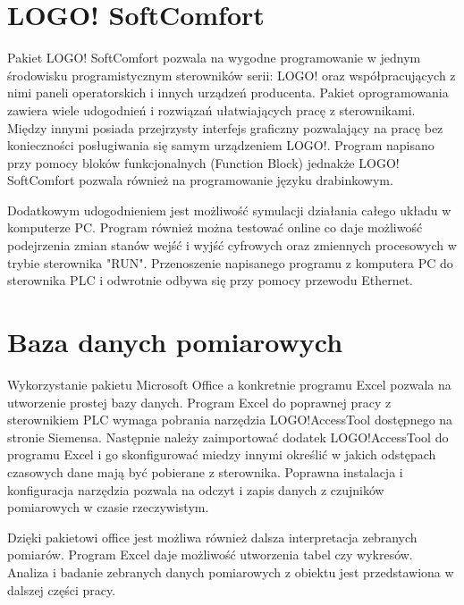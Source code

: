 \documentclass[oneside]{mgr}
\begin{document}
\section{LOGO! SoftComfort}
Pakiet LOGO! SoftComfort pozwala na wygodne programowanie w jednym środowisku programistycznym sterowników serii: LOGO! oraz współpracujących z nimi paneli operatorskich i innych urządzeń producenta. Pakiet oprogramowania zawiera wiele udogodnień i rozwiązań ułatwiających pracę z sterownikami. Między innymi posiada przejrzysty interfejs graficzny pozwalający na pracę bez konieczności posługiwania się samym urządzeniem LOGO!. Program napisano przy pomocy bloków funkcjonalnych (Function Block) jednakże LOGO! SoftComfort pozwala również na programowanie języku drabinkowym.

Dodatkowym udogodnieniem jest możliwość symulacji działania całego układu w komputerze PC. Program również można testować online co daje możliwość podejrzenia zmian stanów wejść i wyjść cyfrowych oraz zmiennych procesowych w trybie sterownika "RUN". Przenoszenie napisanego programu z komputera PC do sterownika PLC i odwrotnie odbywa się przy pomocy przewodu Ethernet.

\section{Baza danych pomiarowych}
Wykorzystanie pakietu Microsoft Office a konkretnie programu Excel pozwala na utworzenie prostej bazy danych. Program Excel do poprawnej pracy z sterownikiem PLC wymaga pobrania narzędzia LOGO!AccessTool dostępnego na stronie Siemensa. Następnie należy zaimportować dodatek LOGO!AccessTool do programu Excel i go skonfigurować miedzy innymi określić w jakich odstępach czasowych dane mają być pobierane z sterownika.  Poprawna instalacja i konfiguracja narzędzia pozwala na odczyt i zapis danych z czujników pomiarowych w czasie rzeczywistym. 

Dzięki pakietowi office jest możliwa również dalsza interpretacja zebranych pomiarów. Program Excel daje możliwość utworzenia tabel czy wykresów. Analiza i badanie zebranych danych pomiarowych z obiektu jest przedstawiona w dalszej części pracy.
\end{document}
